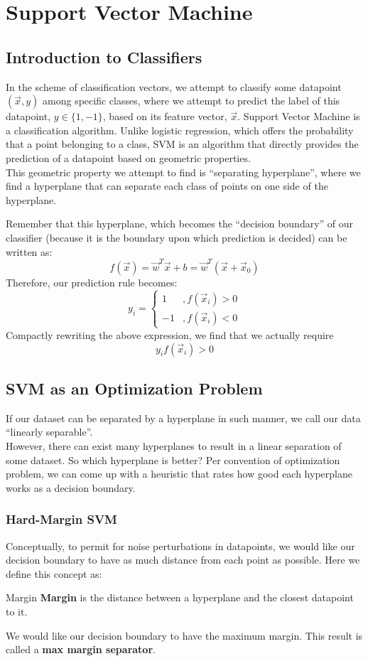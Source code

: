 \chapter{Support Vector Machine}

\section{Introduction to Classifiers}
In the scheme of classification vectors, we attempt to classify some datapoint $(\vec{x}, y)$ among specific classes, where we attempt to predict the label of this datapoint, $y \in \{1, -1\}$, based on its feature vector, $\vec{x}$.
Support Vector Machine is a classification algorithm.
Unlike logistic regression, which offers the probability that a point belonging to a class, SVM is an algorithm that directly provides the prediction of a datapoint based on geometric properties. \\
This geometric property we attempt to find is ``separating hyperplane'', where we find a hyperplane that can separate each class of points on one side of the hyperplane.

Remember that this hyperplane, which becomes the ``decision boundary'' of our classifier (because it is the boundary upon which prediction is decided) can be written as:
\[
    f(\vec{x}) = \vec{w}^T \vec{x} + b = \vec{w}^T (\vec{x} + \vec{x}_0)
\]
Therefore, our prediction rule becomes:
\[
    y_i = \begin{cases}
        1 &, f(\vec{x}_i) > 0 \\
        -1 &, f(\vec{x}_i) < 0
    \end{cases}
\]
Compactly rewriting the above expression, we find that we actually require
\[
    y_i f(\vec{x}_i) > 0
\]

\section{SVM as an Optimization Problem}
If our dataset can be separated by a hyperplane in such manner, we call our data ``linearly separable''. \\
However, there can exist many hyperplanes to result in a linear separation of some dataset.
So which hyperplane is better?
Per convention of optimization problem, we can come up with a heuristic that rates how good each hyperplane works as a decision boundary.

\subsection{Hard-Margin SVM}
Conceptually, to permit for noise perturbations in datapoints, we would like our decision boundary to have as much distance from each point as possible.
Here we define this concept as:
\begin{ln-define}{Margin}{}
    \textbf{Margin} is the distance between a hyperplane and the closest datapoint to it.
\end{ln-define}
We would like our decision boundary to have the maximum margin. This result is called a \textbf{max margin separator}.

